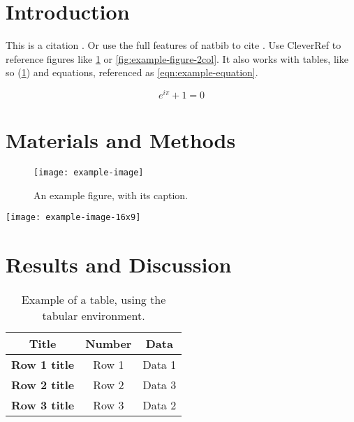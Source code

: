 \documentclass[
    9pt,            %
    commun,         %
    lineno,         %
    tocfig,         %
    affiltop,       %
    debug,          %
]{pi-article}
\begin{document}



\section{Introduction}
This is a citation \citep{A01}. Or use the full features of natbib to cite \citet{B02}.
Use CleverRef to reference figures like \cref{fig:example-figure} or \cref{fig:example-figure-2col}.
It also works with tables, like so (\cref{tbl:example-table}) and equations, referenced as \cref{eqn:example-equation}.

\begin{equation}\label{eqn:example-equation}
    e^{i\pi} + 1 = 0
\end{equation}

\lipsum[1-1] %

\section{Materials and Methods}
\lipsum[2-4] %

\begin{figure}[!htb]
    \centering
    \texttt{[image: example-image]}
    \caption{%
        An example figure, with its caption.
    }\label{fig:example-figure}
\end{figure}

\begin{figure*}[!htb]
    \centering
    \texttt{[image: example-image-16x9]}
    \caption{%
        An example 2-column figure, with its caption. In 1-column mode it appears as a normal figure.
    }\label{fig:example-figure-2col}
\end{figure*}

\lipsum[2-4] %

\section{Results and Discussion}
\lipsum[4-5] %

\begin{table}[htb]
    \caption{%
        Example of a table, using the tabular environment.
    }\label{tbl:example-table}
    \centering
    \begin{tabular}[]{@{}ccc@{}}
    \toprule
    Title & Number & Data \\
    \midrule
    \textbf{Row 1 title} & Row 1 & Data 1 \\
    \textbf{Row 2 title} & Row 2 & Data 3 \\
    \textbf{Row 3 title} & Row 3 & Data 2 \\
    \bottomrule
    \end{tabular}
\end{table}
\end{document}
